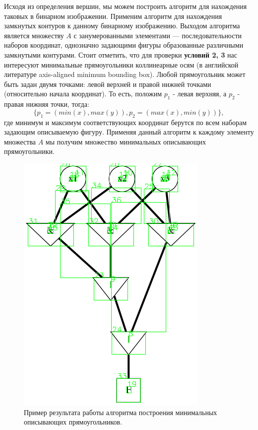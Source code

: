 \documentclass[makeidx, a4paper, 14pt]{extarticle}
\begin{document}
Исходя из определения вершин, мы можем построить алгоритм для нахождения таковых в бинарном изображении.
Применим алгоритм для нахождения замкнутых контуров \cite{suzuki85} к данному бинарному изображению.
Выходом алгоритма является множеству $A$ с занумерованными элементами --- последовательности наборов координат, однозначно
задающими фигуры образованные различными замкнутыми контурами. Стоит отметить, что для проверки \textbf{условий 2, 3} нас интересуют минимальные прямоугольники
коллинеарные осям (в английской литературе axis-aligned minimum bounding box). Любой прямоугольник может быть задан
двумя точками: левой верхней и правой нижней точками (относительно начала координат). То есть, положим $p_{1}$ - левая верхняя,
а $p_2$ - правая нижняя точки, тогда: \[ \{ p_1=(min(x), max(y)), p_2=(max(x), min(y)) \}, \]
где минимум и максимум соответствующих координат берутся по всем наборам задающим описываемую фигуру.
Применяя данный алгоритм к каждому элементу множества $A$ мы получим множество минимальных описывающих прямоугольники. \\

\begin{figure}[H]
    \centering
    \includegraphics[scale=0.75]{img4_contours.png}
    \caption{Пример результата работы алгоритма построения минимальных описывающих прямоугольников.}
\end{figure}
\end{document}
